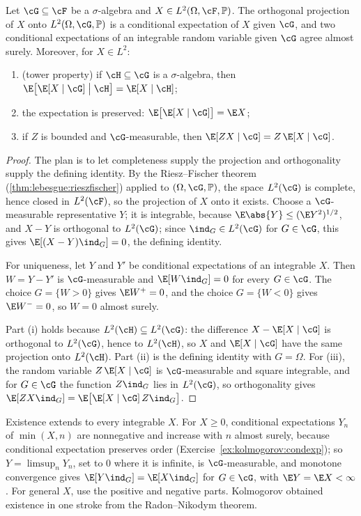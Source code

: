 \begin{refsection}
\begin{theorem}\label{thm:kolmogorov:projection}
Let $\cG\subseteq\cF$ be a $\sigma$-algebra and $X\in L^2(\Omega,\cF,\kolP)$. The orthogonal projection of $X$ onto $L^2(\Omega,\cG,\kolP)$ is a conditional expectation of $X$ given $\cG$, and two conditional expectations of an integrable random variable given $\cG$ agree almost surely. Moreover, for $X\in L^2$:
\begin{enumerate}
\item (tower property) if $\cH\subseteq\cG$ is a $\sigma$-algebra, then $\E\bigl[\E[X\mid\cG]\bigm|\cH\bigr]=\E[X\mid\cH]$;
\item the expectation is preserved: $\E\bigl[\E[X\mid\cG]\bigr]=\E X$;
\item if $Z$ is bounded and $\cG$-measurable, then $\E[ZX\mid\cG]=Z\,\E[X\mid\cG]$.
\end{enumerate}
\end{theorem}

\begin{proof}
The plan is to let completeness supply the projection and orthogonality supply the defining identity. By the Riesz--Fischer theorem (\cref{thm:lebesgue:rieszfischer}) applied to $(\Omega,\cG,\kolP)$, the space $L^2(\cG)$ is complete, hence closed in $L^2(\cF)$, so the projection of $X$ onto it exists. Choose a $\cG$-measurable representative $Y$; it is integrable, because $\E\abs{Y}\le(\E Y^2)^{1/2}$, and $X-Y$ is orthogonal to $L^2(\cG)$; since $\ind_G\in L^2(\cG)$ for $G\in\cG$, this gives $\E[(X-Y)\ind_G]=0$, the defining identity.

For uniqueness, let $Y$ and $Y'$ be conditional expectations of an integrable $X$. Then $W=Y-Y'$ is $\cG$-measurable and $\E[W\ind_G]=0$ for every $G\in\cG$. The choice $G=\{W>0\}$ gives $\E W^+=0$, and the choice $G=\{W<0\}$ gives $\E W^-=0$, so $W=0$ almost surely.

Part (i) holds because $L^2(\cH)\subseteq L^2(\cG)$: the difference $X-\E[X\mid\cG]$ is orthogonal to $L^2(\cG)$, hence to $L^2(\cH)$, so $X$ and $\E[X\mid\cG]$ have the same projection onto $L^2(\cH)$. Part (ii) is the defining identity with $G=\Omega$. For (iii), the random variable $Z\,\E[X\mid\cG]$ is $\cG$-measurable and square integrable, and for $G\in\cG$ the function $Z\ind_G$ lies in $L^2(\cG)$, so orthogonality gives $\E[ZX\ind_G]=\E\bigl[\E[X\mid\cG]\,Z\ind_G\bigr]$.
\end{proof}

Existence extends to every integrable $X$. For $X\ge0$, conditional expectations $Y_n$ of $\min(X,n)$ are nonnegative and increase with $n$ almost surely, because conditional expectation preserves order (Exercise~\ref{ex:kolmogorov:condexp}); so $Y=\limsup_nY_n$, set to $0$ where it is infinite, is $\cG$-measurable, and monotone convergence gives $\E[Y\ind_G]=\E[X\ind_G]$ for $G\in\cG$, with $\E Y=\E X<\infty$. For general $X$, use the positive and negative parts. Kolmogorov obtained existence in one stroke from the Radon--Nikodym theorem.


\end{refsection}
